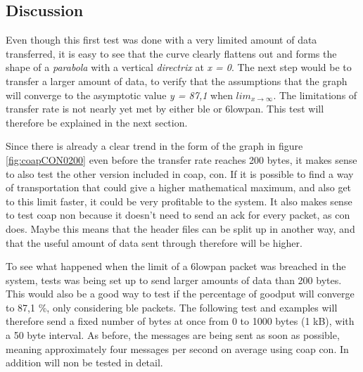 \subsection{Discussion}

Even though this first test was done with a very limited amount of data transferred, it is easy to see that the curve clearly flattens out and forms the shape of a \textit{parabola} with a vertical \textit{directrix} at \textit{x = 0}. The next step would be to transfer a larger amount of data, to verify that the assumptions that the graph will converge to the asymptotic value \textit{y = 87,1} when $lim_{x\to\infty}$. The limitations of transfer rate is not nearly yet met by either \gls{ble} or \gls{6lowpan}. This test will therefore be explained in the next section. 


Since there is already a clear trend in the form of the graph in figure \ref{fig:coapCON0200} even before the transfer rate reaches 200 bytes, it makes sense to also test the other version included in \gls{coap}, \gls{con}. If it is possible to find a way of transportation that could give a higher mathematical maximum, and also get to this limit faster, it could be very profitable to the system. It also makes sense to test \gls{coap} \gls{non} because it doesn’t need to send an \gls{ack} for every packet, as \gls{con} does. Maybe this means that the header files can be split up in another way, and that the useful amount of data sent through therefore will be higher. 



To see what happened when the limit of a \gls{6lowpan} packet was breached in the system, tests was being set up to send larger amounts of data than 200 bytes. This would also be a good way to test if the percentage of goodput will converge to 87,1 \%, only considering \gls{ble} packets. The following test and examples will therefore send a fixed number of bytes at once from 0 to 1000 bytes (1 kB), with a 50 byte interval. As before, the messages are being sent as soon as possible, meaning approximately four messages per second on average using \gls{coap} \gls{con}. In addition will \gls{non} be tested in detail. 


